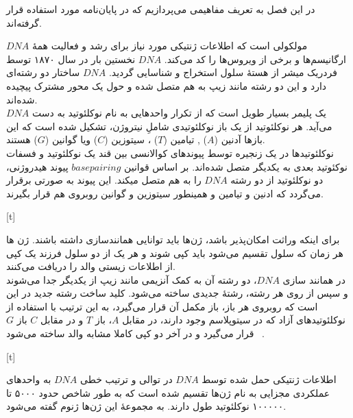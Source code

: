 

در این فصل به تعریف مفاهیمی می‌پردازیم که در پایان‌نامه مورد استفاده قرار گرفته‌اند.




$DNA$ مولکولی است که اطلاعات ژنتیکی مورد نیاز برای رشد و فعالیت همهٔ ارگانیسم‌ها و برخی از ویروس‌ها را کد می‌کند.
 $DNA$ نخستین بار در سال ۱۸۷۰ توسط فردریک میشر از هستهٔ سلول استخراج و شناسایی گردید. $DNA$ ساختار دو رشته‌ای دارد و این دو رشته مانند زیپ به هم متصل شده و حول یک محور مشترک پیچیده شده‌اند.\\
$DNA$ یک پلیمر بسیار طویل است که از تکرار واحدهایی به نام نوکلئوتید به دست می‌آید. هر نوکلئوتید از یک باز نوکلئوتیدی شاملِ نیتروژن، تشکیل شده است که این بازها آدنین ($A$) , تیامین ($T$) ، سیتوزین ($C$) ویا گوانین ($G$) هستند.\\


نوکلئوتیدها در یک زنجیره توسط پیوندهای کوالانسی بین قند یک نوکلئوتید و فسفات نوکئوتید بعدی به یکدیگر متصل شده‌اند. بر اساس قوانین $base pairing$ پیوند هیدروژنی، دو نوکلئوتید از دو رشته $DNA$ را به هم متصل میکند. این پیوند به صورتی برقرار می‌گردد که ادنین و تیامین و همینطور سیتوزین و گوانین روبروی هم قرار بگیرند.


[t]



برای اینکه وراثت امکان‌پذیر باشد، ژن‌ها باید توانایی همانند‌سازی داشته باشند.	ژن ها هر زمان که سلول تقسیم می‌شود باید کپی شوند و هر یک از دو سلول فرزند یک کپی از اطلاعات زیستی والد را دریافت می‌کنند.\\
 در همانند سازی $DNA$، دو رشته آن به کمک آنزیمی مانند زیپ از یکدیگر جدا می‌شوند و سپس از روی هر رشته، رشته‌ٔ جدیدی ساخته می‌شود. کلید ساخت رشته جدید در این است که روبروی هر باز، باز مکمل آن قرار می‌گیرد، به این ترتیب با استفاده از نوکلئوتیدهای آزاد که در سیتوپلاسم وجود دارند‌، در مقابل $A$، باز $T$ و در مقابل $C$ باز $G$ قرار می‌گیرد و در آخر دو کپی کاملا مشابه والد ساخته می‌شود
~\cite{brown2012introduction}.
 

[t]

 
 
 
 اطلاعات ژنتیکی حمل شده توسط $DNA$ در توالی و ترتیب خطی $DNA$ به واحد‌های عملکردی مجزایی به نام ژن‌ها تقسیم شده است که به طور شاخص حدود ۵۰۰۰ تا ۱۰۰۰۰۰ نوکلئوتید طول دارند. به مجموعهٔ این ژن‌ها ژنوم گفته می‌شود.


